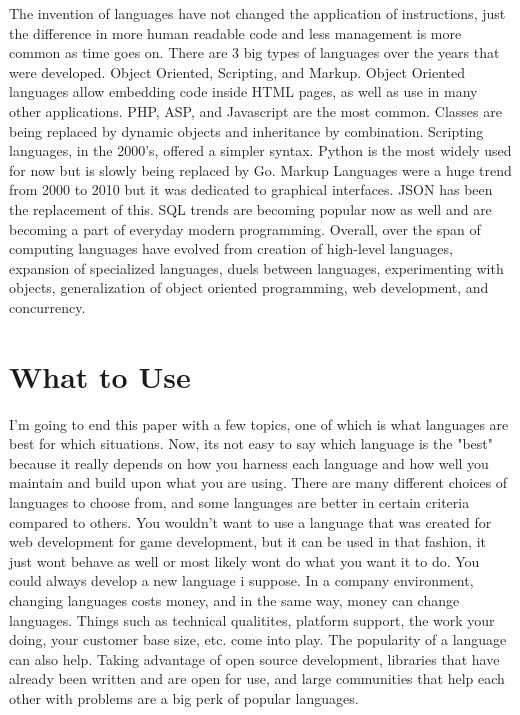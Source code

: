 \documentclass[letterpaper, 10 pt, conference]{IEEEtran}
\begin{document}
\indent The invention of languages have not changed the application of instructions, just the difference in more human readable code and less management is more common as time goes on. There are 3 big types of languages over the years that were developed. Object Oriented, Scripting, and Markup. Object Oriented languages allow embedding code inside HTML pages, as well as use in many other applications. PHP, ASP, and Javascript are the most common. Classes are being replaced by dynamic objects and inheritance by combination. Scripting languages, in the 2000's, offered a simpler syntax. Python is the most widely used for now but is slowly being replaced by Go. Markup Languages were a huge trend from 2000 to 2010 but it was dedicated to graphical interfaces. JSON has been the replacement of this. SQL trends are becoming popular now as well and are becoming a part of everyday modern programming.
\indent Overall, over the span of computing languages have evolved from creation of high-level languages, expansion of specialized languages, duels between languages, experimenting with objects, generalization of object oriented programming, web development, and concurrency. 


\section{What to Use}
\indent I'm going to end this paper with a few topics, one of which is what languages are best for which situations. Now, its not easy to say which language is the "best" because it really depends on how you harness each language and how well you maintain and build upon what you are using. There are many different choices of languages to choose from, and some languages are better in certain criteria compared to others. You wouldn't want to use a language that was created for web development for game development, but it can be used in that fashion, it just wont behave as well or most likely wont do what you want it to do. You could always develop a new language i suppose. In a company environment, changing languages costs money, and in the same way, money can change languages. Things such as technical qualitites, platform support, the work your doing, your customer base size, etc. come into play. The popularity of a language can also help. Taking advantage of open source development, libraries that have already been written and are open for use, and large communities that help each other with problems are a big perk of popular languages. 
\newline
\end{document}
